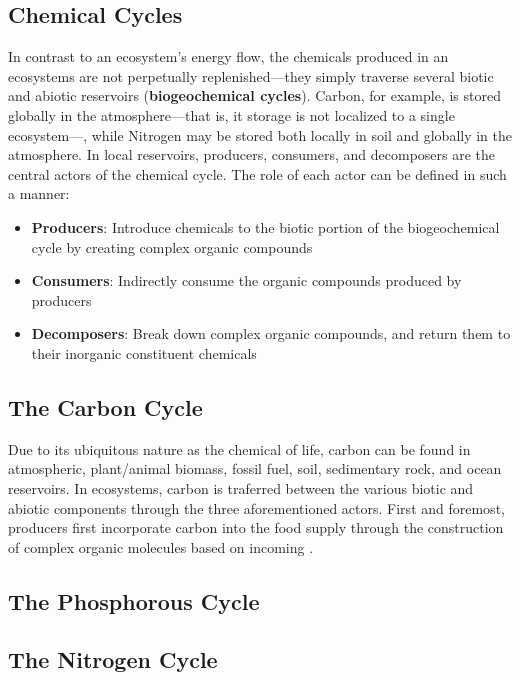 \documentclass{article}
\begin{document}
\subsection{Chemical Cycles}

In contrast to an ecosystem's energy flow, the chemicals produced in an ecosystems
are not perpetually replenished---they simply traverse several biotic and abiotic
reservoirs (\textbf{biogeochemical cycles}). Carbon, for example, is stored globally
in the atmosphere---that is, it storage is not localized to a single ecosystem---,
while Nitrogen may be stored both locally in soil and globally in the atmosphere.
In local reservoirs, producers, consumers, and decomposers are the central actors
of the chemical cycle. The role of each actor can be defined in such a manner:

\begin{itemize}
	\item \textbf{Producers}: Introduce chemicals to the biotic portion of the
	biogeochemical cycle by creating complex organic compounds
	\item \textbf{Consumers}: Indirectly consume the organic compounds produced by
	producers
	\item \textbf{Decomposers}: Break down complex organic compounds, and return
	them to their inorganic constituent chemicals
\end{itemize}

\subsection{The Carbon Cycle}

Due to its ubiquitous nature as the chemical of life, carbon can be found in
atmospheric, plant/animal biomass, fossil fuel, soil, sedimentary rock, and
ocean reservoirs. In ecosystems, carbon is traferred between the various
biotic and abiotic components through the three aforementioned actors.
First and foremost, producers first incorporate carbon into the food supply
through the construction of complex organic molecules based on incoming .

\subsection{The Phosphorous Cycle}

\subsection{The Nitrogen Cycle}
\end{document}
